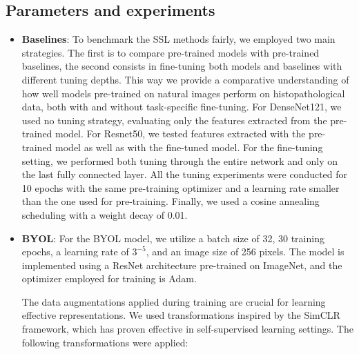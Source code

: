 \documentclass[peerreview]{IEEEtran}
\begin{document}
\subsection{Parameters and experiments}
\begin{itemize}


\item \textbf{Baselines}: 
To benchmark the SSL methods fairly, we employed two main strategies. The first is to compare pre-trained models with pre-trained baselines, the second consists in fine-tuning both models and baselines with different tuning depths. This way we provide a comparative understanding of how well models pre-trained on natural images perform on histopathological data, both with and without task-specific fine-tuning. For DenseNet121, we used no tuning strategy, evaluating only the features extracted from the pre-trained model. For Resnet50, we tested features extracted with the pre-trained model as well as with the fine-tuned model. For the fine-tuning setting, we performed both tuning through the entire network and only on the last fully connected layer. All the tuning experiments were conducted for 10 epochs with the same pre-training optimizer and a learning rate smaller than the one used for pre-training. Finally, we used a cosine annealing scheduling with a weight decay of 0.01.


\item \textbf{BYOL}: For the BYOL model, we utilize a batch size of 32, 30 training epochs, a learning rate of $3^{-5}$, and an image size of 256 pixels. The model is implemented using a ResNet architecture pre-trained on ImageNet, and the optimizer employed for training is Adam. 

The data augmentations applied during training are crucial for learning effective representations. We used transformations inspired by the SimCLR \cite{sfclr}  framework, which has proven effective in self-supervised learning settings. The following transformations were applied:


\end{itemize}
\end{document}
